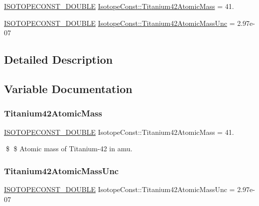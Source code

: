 \begin{DoxyCompactItemize}
\item 
\mbox{\hyperlink{group___isotope_const-_macros_ga8f45a7272ce02c0b4c65c44636ed719a}{I\+S\+O\+T\+O\+P\+E\+C\+O\+N\+S\+T\+\_\+\+D\+O\+U\+B\+LE}} \mbox{\hyperlink{group___isotope_const-_titanium-_ti42_ga948775ccf854aec046437db0b06e23b3}{Isotope\+Const\+::\+Titanium42\+Atomic\+Mass}} = 41.
\item 
\mbox{\hyperlink{group___isotope_const-_macros_ga8f45a7272ce02c0b4c65c44636ed719a}{I\+S\+O\+T\+O\+P\+E\+C\+O\+N\+S\+T\+\_\+\+D\+O\+U\+B\+LE}} \mbox{\hyperlink{group___isotope_const-_titanium-_ti42_ga67acfda3f8cea8fd2e304af0d23666a2}{Isotope\+Const\+::\+Titanium42\+Atomic\+Mass\+Unc}} = 2.\+97e-\/07
\end{DoxyCompactItemize}


\subsection{Detailed Description}


\subsection{Variable Documentation}
\mbox{\label{group___isotope_const-_titanium-_ti42_ga948775ccf854aec046437db0b06e23b3}} 
\subsubsection{\texorpdfstring{Titanium42\+Atomic\+Mass}{Titanium42AtomicMass}}
{\footnotesize\ttfamily \mbox{\hyperlink{group___isotope_const-_macros_ga8f45a7272ce02c0b4c65c44636ed719a}{I\+S\+O\+T\+O\+P\+E\+C\+O\+N\+S\+T\+\_\+\+D\+O\+U\+B\+LE}} Isotope\+Const\+::\+Titanium42\+Atomic\+Mass = 41.}

\$ \$ Atomic mass of Titanium-\/42 in amu. \mbox{\label{group___isotope_const-_titanium-_ti42_ga67acfda3f8cea8fd2e304af0d23666a2}} 
\subsubsection{\texorpdfstring{Titanium42\+Atomic\+Mass\+Unc}{Titanium42AtomicMassUnc}}
{\footnotesize\ttfamily \mbox{\hyperlink{group___isotope_const-_macros_ga8f45a7272ce02c0b4c65c44636ed719a}{I\+S\+O\+T\+O\+P\+E\+C\+O\+N\+S\+T\+\_\+\+D\+O\+U\+B\+LE}} Isotope\+Const\+::\+Titanium42\+Atomic\+Mass\+Unc = 2.\+97e-\/07}

